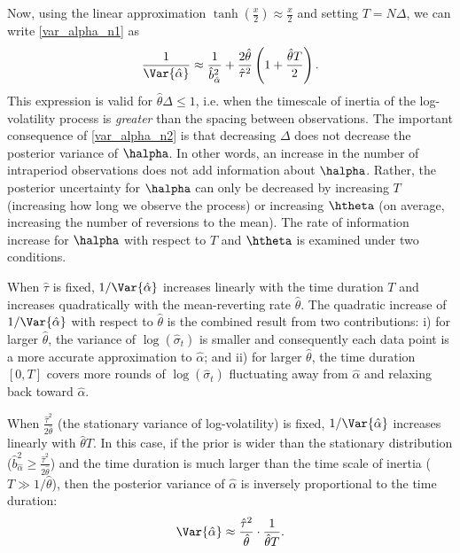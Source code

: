 Now, using the linear approximation $\tanh\left(\frac{x}{2} \right) \approx \frac{x}{2}$ and setting $T=N \Delta $, we can write \eqref{var_alpha_n1} as
\begin{equation}
\frac{1}{\Var{\hat{\alpha}} } \approx \frac{1}{\hat{b}^2_{\hat{\alpha}} } + \frac{2\hat{\theta} }{\hat{\tau}^2}  \left(1 + \frac{\hat{\theta} T}{2} \right).  \label{var_alpha_n2}
\end{equation}
This expression is valid for $\hat{\theta} \Delta \le 1$, i.e. when the timescale of inertia of the log-volatility process is \textit{greater} than the spacing between observations. The important consequence of \eqref{var_alpha_n2} is that decreasing $\Delta$ does not decrease the posterior variance of $\halpha$. In other words, an increase in the number of intraperiod observations does not add information about $\halpha$. Rather, the posterior uncertainty for $\halpha$ can only be decreased by increasing $T$ (increasing how long we observe the process) or increasing $\htheta$ (on average, increasing the number of reversions to the mean). The rate of information increase for $\halpha$ with respect to $T$ and $\htheta$ is examined under two conditions.

When $\hat{\tau}$ is fixed, $1/\Var{\hat{\alpha}} $ increases linearly with the time duration $T$ and increases quadratically with the mean-reverting rate $\hat{\theta} $.  The quadratic increase of $1/\Var{\hat{\alpha}} $ with respect to $\hat{\theta} $ is the combined result from two contributions: i) for larger $\hat{\theta} $, the variance of $\log(\hat{\sigma}_t) $ is smaller and consequently each data point is a more accurate approximation to $\hat{\alpha }$; and ii) for larger $\hat{\theta} $, the time duration $[0, T]$ covers more rounds of $\log(\hat{\sigma}_t) $ fluctuating away from $\hat{\alpha }$ and relaxing back toward $\hat{\alpha }$.

When $\frac{\hat{\tau}^2}{2\hat{\theta} } $ (the stationary variance of log-volatility) is fixed, $1/\Var{\hat{\alpha}} $ increases linearly with $\hat{\theta} T$. In this case, if the prior is wider than the stationary distribution ($\hat{b}^2_{\hat{\alpha}} \ge \frac{\hat{\tau}^2}{2\hat{\theta} } $) and the time duration is much larger than the time scale of inertia ($T \gg 1/\hat{\theta}$), then the posterior variance of $\hat{\alpha} $ is inversely proportional to the time duration:
\begin{equation}
\Var{\hat{\alpha}} \approx \frac{\hat{\tau}^2}{\hat{\theta} } \cdot \frac{1}{\hat{\theta} T}. \label{var_alpha_n3}
\end{equation}

